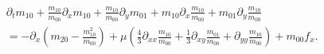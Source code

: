 \begin{equation}
  \label{eq: navier stokes goal}
  \begin{aligned}
    & \partial_t m_{10}
    + \frac{m_{10}}{m_{00}} \partial_x m_{10}
    + \frac{m_{10}}{m_{00}}\partial_y m_{01}
    + m_{10} \partial_x \frac{m_{10}}{m_{00}}
    + m_{01} \partial_y \frac{m_{10}}{m_{00}}
     \\
    & =
    - \partial_x \left(m_{20} - \frac{ m_{10}^2 }{ m_{00} } \right)
     + \mu \left(\frac{4}{3}\partial_{xx}\frac{m_{10}}{m_{00}}
            + \frac{1}{3}\partial_{xy} \frac{m_{01}}{m_{00}}
            + \partial_{yy} \frac{m_{10}}{m_{00}} \right) + m_{00}f_x.
  \end{aligned}
\end{equation}
